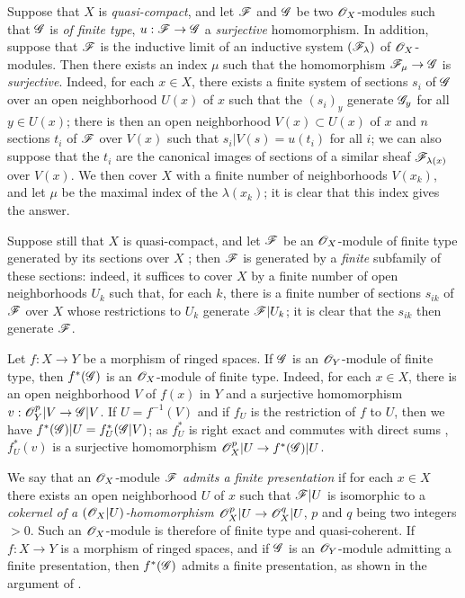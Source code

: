 \begin{env}[5.2.3]
\label{0.5.2.3}
Suppose that $X$ is \emph{quasi-compact}, and let $\mathscr{F}$ and $\mathscr{G}$ be two $\mathscr{O}_X$-modules such that $\mathscr{G}$ is \emph{of finite type}, $u:\sh{F}\to\sh{G}$ a \emph{surjective} homomorphism.
In addition, suppose that $\mathscr{F}$ is the inductive limit of an inductive system $(\mathscr{F}_\lambda)$ of $\mathscr{O}_X$-modules.
Then there exists an index $\mu$ such that the homomorphism $\sh{F}_\mu\to\sh{G}$ is \emph{surjective}.
Indeed, for each $x\in X$, there exists a finite system of sections $s_i$ of $\mathscr{G}$ over an open neighborhood $U(x)$ of $x$ such that the $(s_i)_y$ generate $\mathscr{G}_y$ for all $y\in U(x)$;
there is then an open neighborhood $V(x)\subset U(x)$ of $x$ and $n$ sections $t_i$ of $\mathscr{F}$ over $V(x)$ such that $s_i|V(s)=u(t_i)$ for all $i$;
we can also suppose that the $t_i$ are the canonical images of sections of a similar sheaf $\mathscr{F}_{\lambda(x)}$ over $V(x)$.
We then cover $X$ with a finite number of neighborhoods $V(x_k)$, and let $\mu$ be the maximal index of the $\lambda(x_k)$;
it is clear that this index gives the answer.

Suppose still that $X$ is quasi-compact, and let $\mathscr{F}$ be an $\mathscr{O}_X$-module of finite type generated by its sections over $X$ ;
then $\mathscr{F}$ is generated by a \emph{finite} subfamily of these sections:
indeed, it suffices to cover $X$ by a finite number of open neighborhoods $U_k$ such that, for each $k$, there is a finite number of sections $s_{ik}$ of $\mathscr{F}$ over $X$ whose restrictions to $U_k$ generate $\mathscr{F}|U_k$;
it is clear that the $s_{ik}$ then generate $\mathscr{F}$.
\end{env}

\begin{env}[5.2.4]
\label{0.5.2.4}
Let $f:X\to Y$ be a morphism of ringed spaces.
If $\mathscr{G}$ is an $\mathscr{O}_Y$-module of finite type, then $f^*(\mathscr{G})$ is an $\mathscr{O}_X$-module of finite type.
Indeed, for each $x\in X$, there is an open neighborhood $V$ of $f(x)$ in $Y$ and a surjective homomorphism $v:\sh{O}_Y^p|V\to\sh{G}|V$.
If $U=f^{-1}(V)$ and if $f_U$ is the restriction of $f$ to $U$, then we have $f^*(\mathscr{G})|U=f_U^*(\mathscr{G}|V)$;
as $f_U^*$ is right exact  and commutes with direct sums , $f_U^*(v)$ is a surjective homomorphism $\sh{O}_X^p|U\to f^*(\sh{G})|U$.
\end{env}

\begin{env}[5.2.5]
\label{0.5.2.5}
We say that an $\mathscr{O}_X$-module $\mathscr{F}$ \emph{admits a finite presentation} if for each $x\in X$ there exists an open neighborhood $U$ of $x$ such that $\mathscr{F}|U$ is isomorphic to a \emph{cokernel of a $(\mathscr{O}_X|U)$-homomorphism $\sh{O}_X^p|U\to\sh{O}_X^q|U$}, $p$ and $q$ being two integers $>0$.
Such an $\mathscr{O}_X$-module is therefore of finite type and quasi-coherent.
If $f:X\to Y$ is a morphism of ringed spaces, and if $\mathscr{G}$ is an $\mathscr{O}_Y$-module admitting a finite presentation, then $f^*(\mathscr{G})$ admits a finite presentation, as shown in the argument of .
\end{env}

